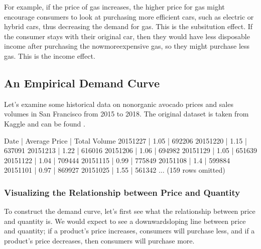 \documentclass[letterpaper,10pt,english]{jupyterBook}
\begin{document}
\sphinxAtStartPar
For example, if the price of gas increases, the higher price for gas might encourage consumers to look at purchasing more efficient cars, such as electric or hybrid cars, thus decreasing the demand for gas. This is the subsitution effect. If the consumer stays with their original car, then they would have less disposable income after purchasing the now\sphinxhyphen{}more\sphinxhyphen{}expensive gas, so they might purchase less gas. This is the income effect.


\subsection{An Empirical Demand Curve}
\label{\detokenize{content/01-demand/02-example:an-empirical-demand-curve}}\label{\detokenize{content/01-demand/02-example::doc}}
\sphinxAtStartPar
Let’s examine some historical data on non\sphinxhyphen{}organic avocado prices and sales volumes in San Francisco from 2015 to 2018. The original dataset is taken from Kaggle and can be found .

\begin{sphinxVerbatim}[commandchars=\\\{\}]
   
\end{sphinxVerbatim}

\begin{sphinxVerbatim}[commandchars=\\\{\}]
Date       | Average Price | Total Volume
2015\PYGZhy{}12\PYGZhy{}27 | 1.05          | 692206
2015\PYGZhy{}12\PYGZhy{}20 | 1.15          | 637091
2015\PYGZhy{}12\PYGZhy{}13 | 1.22          | 616016
2015\PYGZhy{}12\PYGZhy{}06 | 1.06          | 694982
2015\PYGZhy{}11\PYGZhy{}29 | 1.05          | 651639
2015\PYGZhy{}11\PYGZhy{}22 | 1.04          | 709444
2015\PYGZhy{}11\PYGZhy{}15 | 0.99          | 775849
2015\PYGZhy{}11\PYGZhy{}08 | 1.4           | 599884
2015\PYGZhy{}11\PYGZhy{}01 | 0.97          | 869927
2015\PYGZhy{}10\PYGZhy{}25 | 1.55          | 561342
... (159 rows omitted)
\end{sphinxVerbatim}


\subsubsection{Visualizing the Relationship between Price and Quantity}
\label{\detokenize{content/01-demand/02-example:visualizing-the-relationship-between-price-and-quantity}}
\sphinxAtStartPar
To construct the demand curve, let’s first see what the relationship between price and quantity is. We would expect to see a downward\sphinxhyphen{}sloping line between price and quantity; if a product’s price increases, consumers will purchase less, and if a product’s price decreases, then consumers will purchase more.
\end{document}

